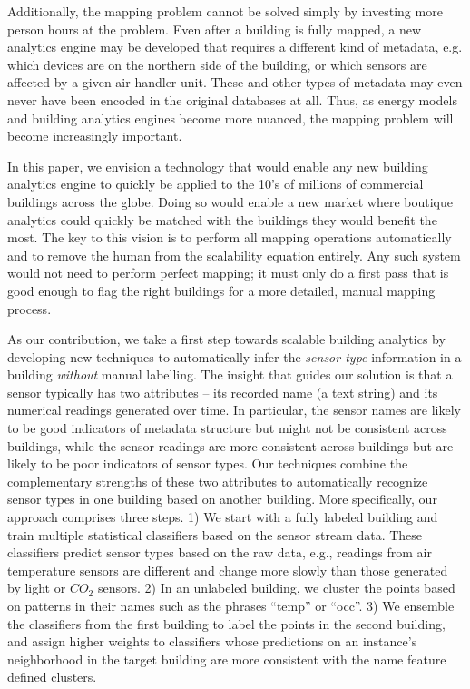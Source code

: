 Additionally, the mapping problem cannot be solved simply by investing more
person hours at the problem. Even after a building is fully mapped, a new
analytics engine may be developed that requires a different kind of metadata,
e.g. which devices are on the northern side of the building, or which sensors
are affected by a given air handler unit. These and other types of metadata may even
never have been encoded in the original databases at all. Thus, as energy
models and building analytics engines become more nuanced, the mapping problem
will become increasingly important.

In this paper, we envision a technology that would enable any new building
analytics engine to quickly be applied to the 10's of millions of commercial
buildings across the globe. Doing so would enable a new market where boutique
analytics could quickly be matched with the buildings they would benefit the
most. The key to this vision is to perform all mapping operations automatically
and to remove the human from the scalability equation entirely. Any such system
would not need to perform perfect mapping; it must only do a first pass that is good
enough to flag the right buildings for a more detailed, manual mapping process.

As our contribution, we take a first step towards scalable building analytics by
developing new techniques to automatically infer the {\it sensor type} information in a building {\em
  without} manual labelling. The insight that guides our solution is that a
sensor typically has two attributes -- its recorded name (a text string) and its numerical readings generated over time. In particular, the sensor names are likely to be good
indicators of metadata structure but might not be consistent across buildings, while the sensor readings are more consistent across buildings but are likely to be poor indicators of sensor types. Our techniques combine the complementary strengths
of these two attributes to automatically recognize sensor types in one building based on another building. More specifically, our approach comprises three steps. 1) We start
with a fully labeled building and train multiple statistical classifiers based on the sensor stream data. These classifiers predict sensor types based on the raw data, e.g., readings from air temperature sensors are different and change more slowly than those generated by light or $CO_2$ sensors. 2) In an
unlabeled building, we cluster the points based on patterns in their names such as the phrases ``temp'' or ``occ''. 3) We ensemble the classifiers from the first building to label the points in the second building, and assign higher weights to classifiers whose predictions on an instance's neighborhood in the target building are more consistent with the name feature defined clusters.

